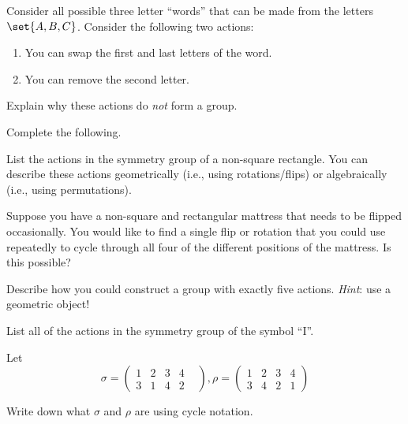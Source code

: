 \documentclass[exam, 12pt]{wvwcdocs}
\begin{document}
\begin{questions}
    \question[10]\label{ques:check-group}
    Consider all possible three letter ``words'' that can be made from the letters \( \set{A, B, C} \).
    Consider the following two actions:
    \begin{enumerate}
    \item You can swap the first and last letters of the word.
    \item You can remove the second letter.
          \end{enumerate}
          Explain why these actions do \textit{not} form a group.


          \question[10]\label{ques:symmetry-group-non-square-rectangle}
          Complete the following.
          \begin{parts}
              \qpart\label{part:symmetry-group-actions}
              List the actions in the symmetry group of a non-square rectangle.
              You can describe these actions geometrically (i.e., using rotations/flips) or algebraically (i.e., using permutations).


              \qpart\label{part:mattress-group}
              Suppose you have a non-square and rectangular mattress that needs to be flipped occasionally.
              You would like to find a single flip or rotation that you could use repeatedly to cycle through all four of the different positions of the mattress.
              Is this possible?


          \end{parts}

          \question[10]\label{ques:group-with-eight-elements}
          Describe how you could construct a group with exactly five actions.
          \textit{Hint}: use a geometric object!


          \question[10]\label{ques:symmetry-group}
          List all of the actions in the symmetry group of the symbol ``I''.


          \question[10]\label{ques:permutations}  Let
          \[
              \sigma = \left(
              \begin{array}{llllll}
                  1 & 2 & 3 & 4 & \\
                  3 & 1 & 4 & 2 &
              \end{array}
              \right), \rho = \left(
              \begin{array}{llllll}
                  1 & 2 & 3 & 4 \\
                  3 & 4 & 2 & 1
              \end{array}
              \right)
          \]
          \begin{parts}
              \qpart\label{part:cycle-notation}
              Write down what \( \sigma \) and \( \rho \) are using cycle notation.



\end{parts}
\end{questions}
\end{document}
